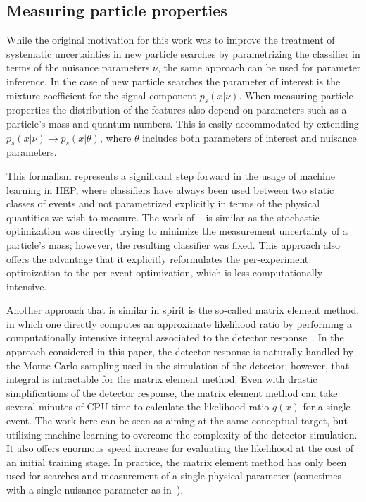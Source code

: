 \documentclass[12pt]{article}
\numberwithin{equation}{section}
\theoremstyle{plain}
\begin{document}
\subsection{Measuring particle properties}

While the original motivation for this work was to improve the treatment of
systematic uncertainties in new particle searches by parametrizing the
classifier in terms of the nuisance parameters $\nu$, the same approach can be
used for parameter inference. In the case of new particle searches the parameter
of interest is the mixture coefficient for the signal component $p_s(x|\nu)$.
When measuring particle properties the distribution of the features also depend
on parameters such as a particle's mass and quantum numbers. This is easily
accommodated by extending $p_s(x|\nu) \to p_s(x|\theta)$, where $\theta$
includes both parameters of interest and nuisance parameters.

This formalism represents a significant step forward in the usage of machine
learning in HEP, where classifiers have always been used between two static
classes of events and not parametrized explicitly in terms of the physical
quantities we wish to measure. The work of  ~\citep{Whiteson:2006ws} is similar
as the stochastic optimization was directly trying to minimize the measurement
uncertainty of a particle's mass; however, the resulting classifier was fixed.
This approach also offers the advantage that it explicitly reformulates the
per-experiment optimization to the per-event optimization, which is less
computationally intensive.

Another approach that is similar in spirit is the so-called matrix element
method, in which one  directly computes an approximate likelihood ratio by
performing a computationally intensive integral associated to the detector
response~\citep{Volobouev:2011vb}. In the approach considered in this paper, the
detector response is naturally handled by the Monte Carlo sampling used in the
simulation of the detector; however, that integral is intractable for the matrix
element method. Even with drastic simplifications of the detector response, the
matrix element method can take several minutes of CPU time to calculate the
likelihood ratio $q(x)$ for a single event. The work here can be seen as aiming
at the same conceptual target, but utilizing machine learning to overcome the
complexity of the detector simulation. It also offers enormous speed increase
for evaluating the likelihood at the cost of an initial training stage. In
practice, the matrix element method has only been used for searches and
measurement of a single physical parameter (sometimes with a single nuisance
parameter as in~\citep{Aaltonen:2010yz}).
\end{document}
